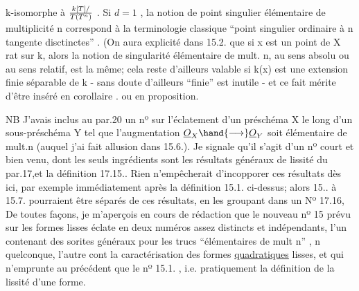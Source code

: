 
k-isomorphe à $k[T]/\over{T}{(}T^n)$ . Si $d=1$ , la notion de point singulier
 élémentaire de multiplicité n correspond à la terminologie
classique ``point singulier ordinaire à n tangente disctinctes'' .
\margin{(}(On aura  explicité dans 15.2. que si x est un point de X rat sur k, alors
la notion de singularité élémentaire de mult. n, au sens absolu ou au
sens relatif,  est la même; cela reste d'ailleurs valable si k(x)
est une extension finie séparable de k - sans doute d'ailleurs ``finie''
est inutile - et ce fait mérite d'être inséré en corollaire .
ou en proposition\hand{)}.

NB J'avais inclus au par.20 un nº sur l'éclatement d'un
préschéma X le long d'un sous-préschéma  Y tel que l'augmentation
$\underline{O}_X \hand{\longrightarrow} \underline{O}_Y$ soit élémentaire de mult.n (auquel j'ai fait allusion dans
15.6.). Je signale qu'il s'agit d'un nº court et bien venu, dont les
seuls ingrédients sont les résultats généraux de lissité du par.17,et
la définition  17.15..  Rien n'empêcherait d'incopporer ces résultats
dès ici,  par exemple immédiatement après la définition
15.1. ci-dessus; alors  15.. à 15.7. pourraient être séparés
de ces  résultats, en les groupant dans un Nº 17.16, 
 De toutes façons, je m'aperçois en cours de rédaction que le
\margin{(}nouveau nº 15 prévu sur les formes lisses éclate en  deux numéros assez
distincts et indépendants, l'un contenant des sorites généraux pour
les trucs ``élémentaires de mult n'' , n quelconque, l'autre  cont la
caractérisation des formes \uline{quadratiques} lisses, et qui n'emprunte au
précédent que le nº 15.1. , i.e. pratiquement la définition de la lissité
d'une forme.

